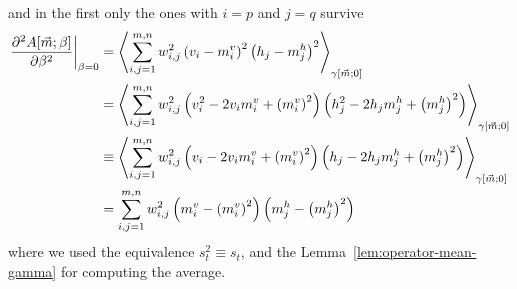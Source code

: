 and in the first only the ones with \(i=p\) and \(j=q\) survive
\begin{align*}
  \left.\frac{\partial^2A{\left[\vec{m};\beta\right]}}{\partial\beta^2}\right|_{\beta=0}
    &=\left\langle\sum_{i,j=1}^{m,n} w_{i,j}^2\left(v_i-m_i^v\right)^2\left(h_j-m_j^h\right)^2\right\rangle_{\gamma{\left[\vec{m};0\right]}} \\
    &=\left\langle\sum_{i,j=1}^{m,n} w_{i,j}^2\left(v_i^2 -2v_im_i^v+{\left(m_i^v\right)}^2\right)\left(h_j^2-2h_jm_j^h +{\left(m_j^h\right)}^2\right)\right\rangle_{\gamma{\left[\vec{m};0\right]}}\\
    &\equiv\left\langle\sum_{i,j=1}^{m,n} w_{i,j}^2\left(v_i-2v_im_i^v+{\left(m_i^v\right)}^2\right)\left(h_j-2h_jm_j^h +{\left(m_j^h\right)}^2\right)\right\rangle_{\gamma{\left[\vec{m};0\right]}}\\
    &=\sum_{i,j=1}^{m,n} w_{i,j}^2\left(m_i^v-{\left(m_i^v\right)}^2\right)\left(m_j^h-{\left(m_j^h\right)}^2\right)
\end{align*}
where we used the equivalence \(s_t^2 \equiv s_t\), and the Lemma~\ref{lem:operator-mean-gamma}
for computing the average.

